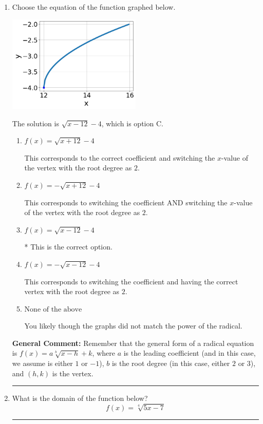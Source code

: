 \documentclass{extbook}[14pt]
\newcommand{\litem}[1]{\item #1

\rule{\textwidth}{0.4pt}}
\begin{document}
\begin{enumerate}\litem{
Choose the equation of the function graphed below.

\begin{center}
    \includegraphics[width=0.5\textwidth]{../Figures/radicalGraphToEquationCopyC.png}
\end{center}




The solution is \( \sqrt{x - 12} - 4 \), which is option C.\begin{enumerate}[label=\Alph*.]
\item \( f(x) = \sqrt{x + 12} - 4 \)

This corresponds to the correct coefficient and switching the $x$-value of the vertex with the root degree as $2$.
\item \( f(x) = - \sqrt{x + 12} - 4 \)

This corresponds to switching the coefficient AND switching the $x$-value of the vertex with the root degree as $2$.
\item \( f(x) = \sqrt{x - 12} - 4 \)

* This is the correct option.
\item \( f(x) = - \sqrt{x - 12} - 4 \)

This corresponds to switching the coefficient and having the correct vertex with the root degree as $2$.
\item \( \text{None of the above} \)

You likely though the graphs did not match the power of the radical.
\end{enumerate}

\textbf{General Comment:} Remember that the general form of a radical equation is $ f(x) = a \sqrt[b]{x - h} + k$, where $a$ is the leading coefficient (and in this case, we assume is either $1$ or $-1$), $b$ is the root degree (in this case, either $2$ or $3$), and $(h, k)$ is the vertex.
}
\litem{
What is the domain of the function below?
\[ f(x) = \sqrt[4]{5 x - 7} \]

}
\end{enumerate}
\end{document}
